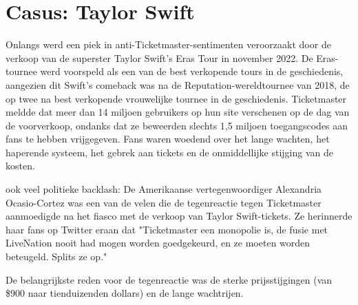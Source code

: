 
\section{Casus: Taylor Swift}
Onlangs werd een piek in anti-Ticketmaster-sentimenten veroorzaakt door de verkoop van de superster Taylor Swift's Eras Tour in november 2022. De Eras-tournee werd voorspeld als een van de best verkopende tours in de geschiedenis, aangezien dit Swift's comeback was na de Reputation-wereldtournee van 2018, de op twee na best verkopende vrouwelijke tournee in de geschiedenis. Ticketmaster meldde dat meer dan 14 miljoen gebruikers op hun site verschenen op de dag van de voorverkoop, ondanks dat ze beweerden slechts 1,5 miljoen toegangscodes aan fans te hebben vrijgegeven. Fans waren woedend over het lange wachten, het haperende systeem, het gebrek aan tickets en de onmiddellijke stijging van de kosten.

ook veel politieke backlash:
De Amerikaanse vertegenwoordiger Alexandria Ocasio-Cortez was een van de velen die de tegenreactie tegen Ticketmaster aanmoedigde na het fiasco met de verkoop van Taylor Swift-tickets. Ze herinnerde haar fans op Twitter eraan dat "Ticketmaster een monopolie is, de fusie met LiveNation nooit had mogen worden goedgekeurd, en ze moeten worden beteugeld. Splits ze op."

De belangrijkste reden voor de tegenreactie was de sterke prijsstijgingen (van \$900 naar tienduizenden dollars) en de lange wachtrijen.
